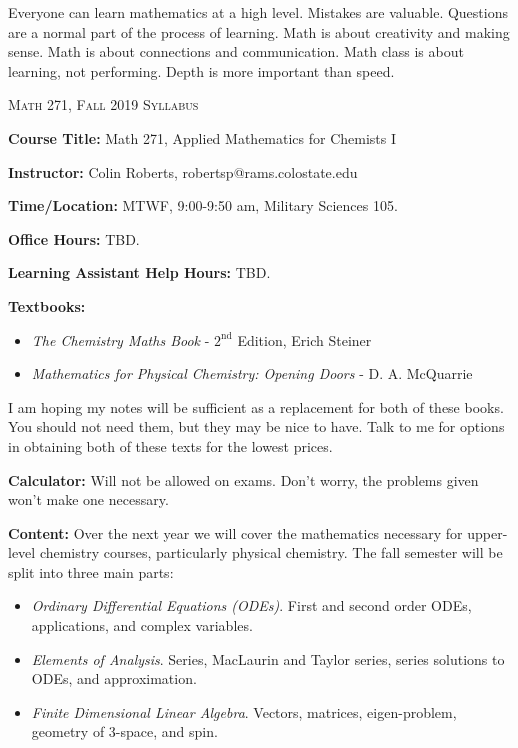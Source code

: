 \documentclass[12pt]{amsbook}
\begin{document}

\SetWatermarkText{
\begin{minipage}[c][8cm]{8cm}
\begin{center}
 
\end{center}
\end{minipage}
}

Everyone can learn mathematics at a high level.
Mistakes are valuable.
Questions are a normal part of the process of learning.
Math is about creativity and making sense.
Math is about connections and communication.
Math class is about learning, not performing.
Depth is more important than speed.




\begin{center}
   \textsc{\large Math 271, Fall 2019 Syllabus}
\end{center}
\vspace{.5cm}

\textbf{Course Title:} Math 271, Applied Mathematics for Chemists I

\textbf{Instructor:} Colin Roberts, robertsp@rams.colostate.edu

\textbf{Time/Location:} MTWF, 9:00-9:50 am, Military Sciences 105.  

\textbf{Office Hours:} TBD.

\textbf{Learning Assistant Help Hours:} TBD.

\textbf{Textbooks:} \begin{itemize}
    \item \emph{The Chemistry Maths Book} - $2^{\text{nd}}$ Edition, Erich Steiner
    \item \emph{Mathematics for Physical Chemistry: Opening Doors} - D. A. McQuarrie
\end{itemize}
I am hoping my notes will be sufficient as a replacement for both of these books.  You should not need them, but they may be nice to have.  Talk to me for options in obtaining both of these texts for the lowest prices.

\textbf{Calculator:} Will not be allowed on exams.  Don't worry, the problems given won't make one necessary.

\textbf{Content:} Over the next year we will cover the mathematics necessary for upper-level chemistry courses, particularly physical chemistry. The fall semester will be split into three main parts:
\begin{itemize}
    \item \emph{Ordinary Differential Equations (ODEs)}. First and second order ODEs, applications, and complex variables.
    \item \emph{Elements of Analysis}. Series, MacLaurin and Taylor series, series solutions to ODEs, and approximation.
    \item \emph{Finite Dimensional Linear Algebra}. Vectors, matrices, eigen-problem, geometry of 3-space, and spin.
\end{itemize}
\end{document}

